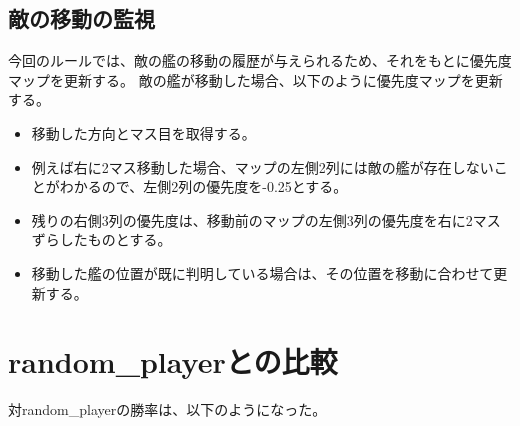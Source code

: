 \documentclass[a4paper,10pt]{ltjsarticle}
\begin{document}
\subsection{敵の移動の監視}
今回のルールでは、敵の艦の移動の履歴が与えられるため、それをもとに優先度マップを更新する。
敵の艦が移動した場合、以下のように優先度マップを更新する。
\begin{itemize}
    \item 移動した方向とマス目を取得する。
    \item 例えば右に2マス移動した場合、マップの左側2列には敵の艦が存在しないことがわかるので、左側2列の優先度を-0.25とする。
    \item 残りの右側3列の優先度は、移動前のマップの左側3列の優先度を右に2マスずらしたものとする。
    \item 移動した艦の位置が既に判明している場合は、その位置を移動に合わせて更新する。
\end{itemize}

\section{random\_playerとの比較}
対random\_playerの勝率は、以下のようになった。


\printbibliography
\end{document}
